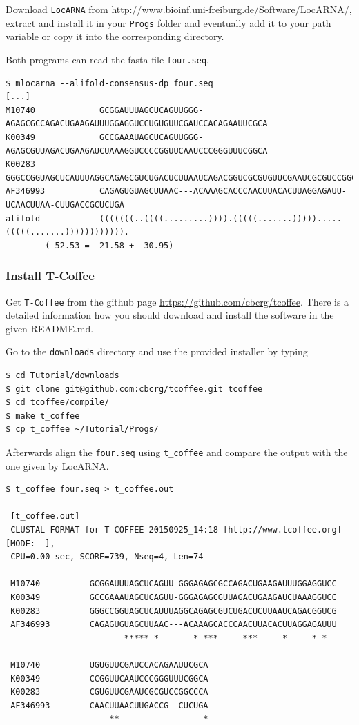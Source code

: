 \documentclass[a4paper]{article}
\newcommand{\frametitle}[1]{\subsubsection{#1}}
\begin{document}
Download \texttt{LocARNA} from \url{http://www.bioinf.uni-freiburg.de/Software/LocARNA/}, 
extract and install it in your \texttt{Progs} folder and eventually add it to your 
path variable or copy it into the corresponding directory.

Both programs can read the fasta file \texttt{four.seq}.
\begin{verbatim}
$ mlocarna --alifold-consensus-dp four.seq
[...]
M10740             GCGGAUUUAGCUCAGUUGGG-AGAGCGCCAGACUGAAGAUUUGGAGGUCCUGUGUUCGAUCCACAGAAUUCGCA
K00349             GCCGAAAUAGCUCAGUUGGG-AGAGCGUUAGACUGAAGAUCUAAAGGUCCCCGGUUCAAUCCCGGGUUUCGGCA
K00283             GGGCCGGUAGCUCAUUUAGGCAGAGCGUCUGACUCUUAAUCAGACGGUCGCGUGUUCGAAUCGCGUCCGGCCCA
AF346993           CAGAGUGUAGCUUAAC---ACAAAGCACCCAACUUACACUUAGGAGAUU-UCAACUUAA-CUUGACCGCUCUGA
alifold            (((((((..((((.........)))).(((((.......))))).....(((((.......)))))))))))). 
        (-52.53 = -21.58 + -30.95) 
\end{verbatim}%

\frametitle{Install T-Coffee}

Get \texttt{T-Coffee} from the github page
\url{https://github.com/cbcrg/tcoffee}. There is a detailed
information how you should download and install the software in the
given README.md.

Go to the \texttt{downloads} directory and use the provided installer
by typing
\begin{verbatim}
$ cd Tutorial/downloads
$ git clone git@github.com:cbcrg/tcoffee.git tcoffee
$ cd tcoffee/compile/
$ make t_coffee
$ cp t_coffee ~/Tutorial/Progs/
\end{verbatim}

Afterwards align the \texttt{four.seq} using \texttt{t\_coffee} and compare the output with 
the one given by LocARNA. 
\begin{verbatim}
$ t_coffee four.seq > t_coffee.out

 [t_coffee.out]
 CLUSTAL FORMAT for T-COFFEE 20150925_14:18 [http://www.tcoffee.org] [MODE:  ],
 CPU=0.00 sec, SCORE=739, Nseq=4, Len=74 

 M10740          GCGGAUUUAGCUCAGUU-GGGAGAGCGCCAGACUGAAGAUUUGGAGGUCC
 K00349          GCCGAAAUAGCUCAGUU-GGGAGAGCGUUAGACUGAAGAUCUAAAGGUCC
 K00283          GGGCCGGUAGCUCAUUUAGGCAGAGCGUCUGACUCUUAAUCAGACGGUCG
 AF346993        CAGAGUGUAGCUUAAC---ACAAAGCACCCAACUUACACUUAGGAGAUUU
                        ***** *       * ***     ***     *     * *  

 M10740          UGUGUUCGAUCCACAGAAUUCGCA
 K00349          CCGGUUCAAUCCCGGGUUUCGGCA
 K00283          CGUGUUCGAAUCGCGUCCGGCCCA
 AF346993        CAACUUAACUUGACCG--CUCUGA
                     **                 *
\end{verbatim}
\end{document}

